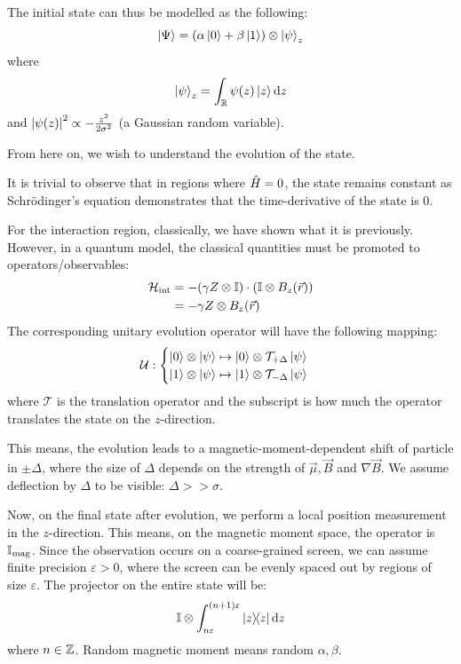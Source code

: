 The initial state can thus be modelled as the following:
$$\ket{\Psi} = (\alpha \ket{0} + \beta \ket{1}) \otimes \ket{\psi}_z$$
where
$$\ket{\psi}_z = \int_{\mathbb{R}} \psi(z)\ket{z} \dd z$$
and $\abs{\psi(z)}^2 \propto -\frac{z^2}{2\sigma^2}$ (a Gaussian random variable). \par
From here on, we wish to understand the evolution of the state. \par
It is trivial to observe that in regions where $\hat{H} = 0$, the state remains constant as Schr\"odinger's equation demonstrates that the time-derivative of the state is $0$. \par
For the interaction region, classically, we have shown what it is previously. However, in a quantum model, the classical quantities must be promoted to operators/observables:
\begin{align*}
    \mathcal{H}_{\text{int}} &= - (\gamma Z \otimes \mathbb{I}) \cdot (\mathbb{I} \otimes B_z(\vec{r})) \\
    &= -\gamma Z \otimes B_z(\vec{r})
\end{align*}
The corresponding unitary evolution operator will have the following mapping:
$$\mathcal{U}: \begin{cases}
    \ket{0} \otimes \ket{\psi} \mapsto \ket{0} \otimes \mathcal{T}_{+\Delta}\ket{\psi} \\
    \ket{1} \otimes \ket{\psi} \mapsto \ket{1} \otimes \mathcal{T}_{-\Delta}\ket{\psi}
\end{cases}$$
where $\mathcal{T}$ is the translation operator and the subscript is how much the operator translates the state on the $z$-direction. \par
This means, the evolution leads to a magnetic-moment-dependent shift of particle in $\pm \Delta$, where the size of $\Delta$ depends on the strength of $\vec{\mu}, \vec{B}$ and $\nabla\vec{B}$. We assume deflection by $\Delta$ to be visible: $\Delta >> \sigma$. \par
Now, on the final state after evolution, we perform a local position measurement in the $z$-direction. This means, on the magnetic moment space, the operator is $\mathbb{I}_{\text{mag}}$. Since the observation occurs on a coarse-grained screen, we can assume finite precision $\varepsilon > 0$, where the screen can be evenly spaced out by regions of size $\varepsilon$. The projector on the entire state will be:
$$\id \otimes \int_{n\varepsilon}^{(n+1)\varepsilon} \dyad{z} \dd z$$
where $n \in \mathbb{Z}$. Random magnetic moment means random $\alpha, \beta$.

